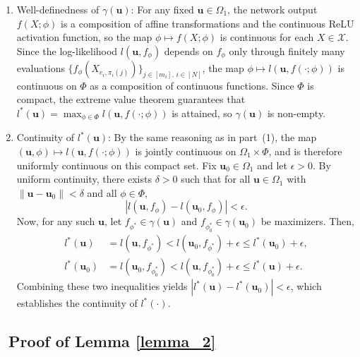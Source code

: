 \documentclass[
  12pt]{article}
\begin{document}
\begin{enumerate}
    \item Well-definedness of $\gamma(\boldsymbol{u})$:
For any fixed $\boldsymbol{u} \in \Omega_1$, the network output $f(X;\phi)$ is a composition of affine transformations and the continuous ReLU activation function, so the map $\phi \mapsto f(X;\phi)$ is continuous for each $X \in \mathcal{X}$. Since the log-likelihood $l(\boldsymbol{u}, f_\phi)$ depends on $f_\phi$ only through finitely many evaluations $\{f_\phi(X_{e_i,\pi_i(j)})\}_{j\in[m_i],\, i\in[N]}$, the map $\phi \mapsto l(\boldsymbol{u}, f(\cdot;\phi))$ is continuous on $\Phi$ as a composition of continuous functions. Since $\Phi$ is compact, the extreme value theorem guarantees that $l^*(\boldsymbol{u}) = \max_{\phi \in \Phi} l(\boldsymbol{u}, f(\cdot;\phi))$ is attained, so $\gamma(\boldsymbol{u})$ is non-empty.
    \item Continuity of $l^*(\boldsymbol{u})$:
By the same reasoning as in part~(1), the map $(\boldsymbol{u},\phi) \mapsto l(\boldsymbol{u}, f(\cdot;\phi))$ is jointly continuous on $\Omega_1 \times \Phi$, and is therefore uniformly continuous on this compact set. Fix $\boldsymbol{u}_0 \in \Omega_1$ and let $\epsilon > 0$. By uniform continuity, there exists $\delta > 0$ such that for all $\boldsymbol{u} \in \Omega_1$ with $\|\boldsymbol{u} - \boldsymbol{u}_0\| < \delta$ and all $\phi \in \Phi$,
$$|l(\boldsymbol{u}, f_\phi) - l(\boldsymbol{u}_0, f_\phi)| < \epsilon.$$
Now, for any such $\boldsymbol{u}$, let $f_{\phi^*} \in \gamma(\boldsymbol{u})$ and $f_{\phi_0^*} \in \gamma(\boldsymbol{u}_0)$ be maximizers. Then,
$$\begin{aligned}
l^*(\boldsymbol{u}) &= l(\boldsymbol{u}, f_{\phi^*}) < l(\boldsymbol{u}_0, f_{\phi^*}) + \epsilon \leq l^*(\boldsymbol{u}_0) + \epsilon, \\
l^*(\boldsymbol{u}_0) &= l(\boldsymbol{u}_0, f_{\phi_0^*}) < l(\boldsymbol{u}, f_{\phi_0^*}) + \epsilon \leq l^*(\boldsymbol{u}) + \epsilon.
\end{aligned}$$
Combining these two inequalities yields $|l^*(\boldsymbol{u}) - l^*(\boldsymbol{u}_0)| < \epsilon$, which establishes the continuity of $l^*(\cdot)$.
\end{enumerate}   

\subsection{~Proof of Lemma \ref{lemma_2}}
\end{document}
